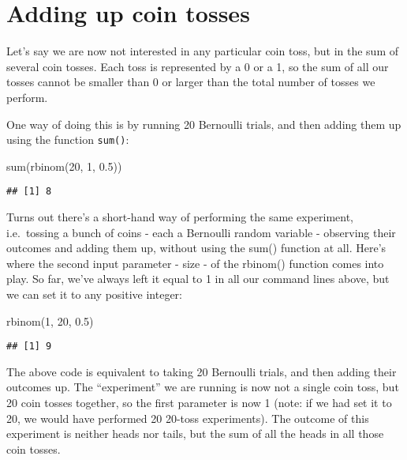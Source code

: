 \documentclass[
]{book}
\newenvironment{Shaded}{\begin{snugshade}}{\end{snugshade}}
\newcommand{\DecValTok}[1]{\textcolor[rgb]{0.00,0.00,0.81}{#1}}
\newcommand{\FloatTok}[1]{\textcolor[rgb]{0.00,0.00,0.81}{#1}}
\newcommand{\FunctionTok}[1]{\textcolor[rgb]{0.00,0.00,0.00}{#1}}
\newcommand{\NormalTok}[1]{#1}
\begin{document}
\hypertarget{adding-up-coin-tosses}{%
\section{Adding up coin tosses}\label{adding-up-coin-tosses}}

Let's say we are now not interested in any particular coin toss, but in the sum of several coin tosses. Each toss is represented by a 0 or a 1, so the sum of all our tosses cannot be smaller than 0 or larger than the total number of tosses we perform.

One way of doing this is by running 20 Bernoulli trials, and then adding them up using the function \texttt{sum()}:

\begin{Shaded}
\begin{Highlighting}[]
\FunctionTok{sum}\NormalTok{(}\FunctionTok{rbinom}\NormalTok{(}\DecValTok{20}\NormalTok{, }\DecValTok{1}\NormalTok{, }\FloatTok{0.5}\NormalTok{))}
\end{Highlighting}
\end{Shaded}

\begin{verbatim}
## [1] 8
\end{verbatim}

Turns out there's a short-hand way of performing the same experiment, i.e.~tossing a bunch of coins - each a Bernoulli random variable - observing their outcomes and adding them up, without using the sum() function at all. Here's where the second input parameter - size - of the rbinom() function comes into play. So far, we've always left it equal to 1 in all our command lines above, but we can set it to any positive integer:

\begin{Shaded}
\begin{Highlighting}[]
\FunctionTok{rbinom}\NormalTok{(}\DecValTok{1}\NormalTok{, }\DecValTok{20}\NormalTok{, }\FloatTok{0.5}\NormalTok{)}
\end{Highlighting}
\end{Shaded}

\begin{verbatim}
## [1] 9
\end{verbatim}

The above code is equivalent to taking 20 Bernoulli trials, and then adding their outcomes up. The ``experiment'' we are running is now not a single coin toss, but 20 coin tosses together, so the first parameter is now 1 (note: if we had set it to 20, we would have performed 20 20-toss experiments). The outcome of this experiment is neither heads nor tails, but the sum of all the heads in all those coin tosses.
\end{document}

